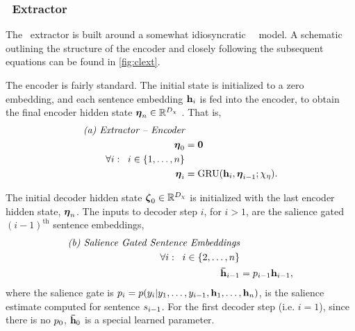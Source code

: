 



\subsubsection{\clext~Extractor}

The \clext~extractor \citep{cheng2016neural} 
is built around a somewhat idiosyncratic 
\unidirectional~\sequencetosequence~model. A schematic outlining the 
structure of the encoder and closely following the subsequent 
equations can be found in \autoref{fig:clext}.

The encoder is fairly standard. The initial state is initialized to
a zero embedding, and each sentence embedding $\mathbf{h}_i$ is fed into 
the encoder, to obtain the final encoder hidden state $\boldsymbol{\eta}_n \in \mathbb{R}^{{D_{\chi}}}$ . That is,
\begin{align}
    \textit{(a) Extractor -- Encoder} & \nonumber \\
    \boldsymbol{\eta}_0 & = \mathbf{0} \\
    \forall i : \;\; i \in \{1,\ldots,n\}&\nonumber\\
    \boldsymbol{\eta}_i &= \operatorname{GRU}(\mathbf{h}_i, \boldsymbol{\eta}_{i-1};\chi_\eta).
\end{align}

The initial decoder hidden state $\boldsymbol{\zeta}_0 \in \mathbb{R}^{{D_{\chi}}}$ is 
initialized with the last encoder hidden state, $\boldsymbol{\eta}_n$.
The inputs
to decoder step $i$, for $i >1$, are the salience gated $(i-1)^\textrm{th}$ sentence embeddings,
\begin{align}
    \textit{(b) Salience Gated Sentence Embeddings}&\nonumber\\
    \forall i: \;\; i \in \{2,\dots,n\}& \nonumber\\
    \boldsymbol{\bar{\mathbf{h}}}_{i-1} & = p_{i-1}\mathbf{h}_{i-1},
\end{align}
where the salience gate is 
$p_i = p(y_i|y_1,\ldots,y_{i-1},
                        \mathbf{h}_1,\ldots,\mathbf{h}_n)$, is the
                        salience estimate computed for sentence $s_{i-1}$.
                        For the first decoder step (i.e. $i=1$), since there is no $p_0$, $\boldsymbol{\bar{\mathbf{h}}}_0$ is a special learned parameter.



